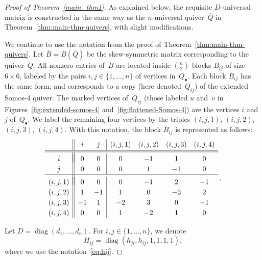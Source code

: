 \documentclass[10pt]{amsart}
\theoremstyle{definition}
\newcommand{\cf}{cf.}
\DeclareMathOperator{\diag}{diag}
\begin{document}
\begin{proof}[Proof of Theorem~\ref{main_thm1}]
As explained below, the requisite $D$-universal matrix is constructed in the same way as the $n$-universal quiver~$\overline Q$ in Theorem~\ref{thm:main-thm-quivers}, with slight modifications. 

We continue to use the notation from the proof of Theorem~\ref{thm:main-thm-quivers}. 
Let $\overline B=B(\overline Q)$ be the skew-symmetric matrix corresponding to the quiver~$\overline Q$. All nonzero entries of~$\overline B$ are located inside $\binom{n}{2}$ blocks $\overline B_{ij}$ of size $6\times 6$, labeled by the pairs $i,j\in\{1,\dots,n\}$ of vertices in~$Q_\bullet$. Each block $\overline B_{ij}$ has the same form, and corresponds to a copy (here denoted~$Q_{ij}$) of the extended Somos-4 quiver. The marked vertices of~$Q_{ij}$ (those labeled $u$ and~$v$ in Figures~\ref{fig:extended-somos-4} and~\ref{fig:flattened-Somos-4}) are the vertices $i$ and~$j$ of~$Q_\bullet$. We label the remaining four vertices by the triples $(i,j,1)$, $(i,j,2)$, $(i,j,3)$, $(i,j,4)$. With this notation, the block $\overline B_{ij}$ is represented as follows:
\begin{equation}
\label{eq:overline-Bij}
\renewcommand{\arraystretch}{1.2}
\begin{array}{c||cc|cccc}
& i & j & (i,j,1) & (i,j,2) & (i,j,3) & (i,j,4) \\[1pt]
\hline
\hline
\\[-12pt]
i & 0 & 0 & 0 & -1 & 1 & 0 \\
j & 0 & 0 & 0 & 1 & -1 & 0 \\
\hline
\\[-11pt]
(i,j,1) & 0 & 0 & 0 & -1 & 2 & -1 \\
(i,j,2) & 1 & -1 & 1 & 0 & -3 & 2 \\
(i,j,3) & -1 &1 &-2 & 3 & 0 & -1 \\
(i,j,4) & 0 & 0 & 1 & -2 & 1 &0 
\end{array}\,.
\end{equation}

Let $D=\diag (d_1,\dots,d_n)$. For $i,j\in\{1,\dots,n\}$, we denote
\[
H_{ij}=\diag (h_{ji},h_{ij},1,1,1,1), 
\]
where we use the notation~\eqref{eq:hij}. 


\end{proof}
\end{document}
